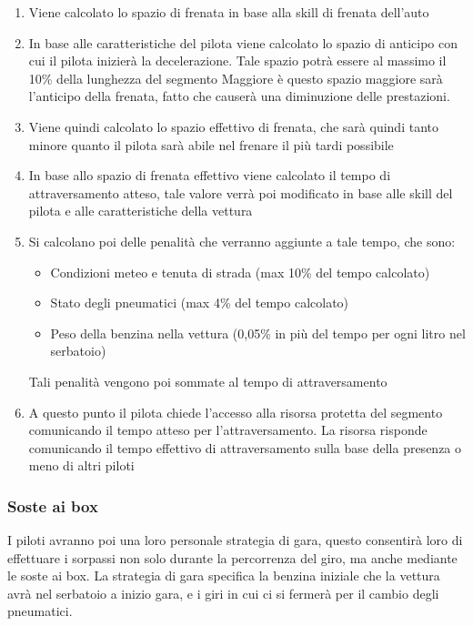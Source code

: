 \documentclass[a4paper,11pt, twoside]{book}
\begin{document}
	  \begin{enumerate}
	    \item Viene calcolato lo spazio di frenata in base alla skill di frenata dell'auto
	    \item In base alle caratteristiche del pilota viene calcolato lo spazio di anticipo con cui il
		  pilota inizierà la decelerazione. Tale spazio potrà essere al massimo il 10\% della lunghezza del segmento
		  Maggiore è questo spazio maggiore sarà l'anticipo della frenata, fatto che causerà una diminuzione delle prestazioni.
	    \item Viene quindi calcolato lo spazio effettivo di frenata, che sarà quindi tanto minore quanto
		  il pilota sarà abile nel frenare il più tardi possibile
	    \item In base allo spazio di frenata effettivo viene calcolato il tempo di attraversamento atteso, tale valore
	          verrà poi modificato in base alle skill del pilota e alle caratteristiche della vettura
	    \item Si calcolano poi delle penalità che verranno aggiunte a tale tempo, che sono:
		  \begin{itemize}
		    \item Condizioni meteo e tenuta di strada (max 10\% del tempo calcolato)
		    \item Stato degli pneumatici (max 4\% del tempo calcolato)
		    \item Peso della benzina nella vettura (0,05\% in più del tempo per ogni litro nel serbatoio)
		  \end{itemize}
		  Tali penalità vengono poi sommate al tempo di attraversamento
	    \item A questo punto il pilota chiede l'accesso alla risorsa protetta del segmento
		  comunicando il tempo atteso per l'attraversamento. La risorsa risponde comunicando il tempo
		  effettivo di attraversamento sulla base della presenza o meno di altri piloti
	  \end{enumerate}
	  
	  

	\subsubsection{Soste ai box}
    
	  I piloti avranno poi una loro personale strategia di gara, questo consentirà loro di effettuare
	  i sorpassi non solo durante la percorrenza del giro, ma anche mediante le soste ai box.
	  La strategia di gara specifica la benzina iniziale che la vettura avrà nel serbatoio a inizio gara,
	  e i giri in cui ci si fermerà per il cambio degli pneumatici.
	  
\end{document}
